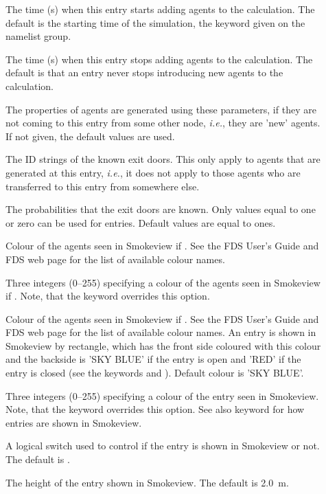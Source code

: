 \documentclass[12pt,a4paper,final,twoside]{stylevk}
\begin{document}
\begin{description}
%
\item[] The time (s) when this entry starts adding
  agents to the calculation.  The default is the starting time of the
  simulation, the  keyword given on the  
  namelist group.
%
\item[] The time (s) when this entry stops adding
  agents to the calculation.  The default is that an entry never stops
  introducing new agents to the calculation.
%
\item[] The properties of agents are generated using
  these parameters, if they are not coming to this entry from some
  other node, \emph{i.e.}, they are 'new' agents.  If not given, the
  default values are used.
%
\item[] The ID strings of the known exit
  doors.  This only apply to agents that are generated at this entry,
  \emph{i.e.}, it does not apply to those agents who are transferred to
  this entry from somewhere else.
%
\item[] The probabilities that the exit
  doors are known.  Only values equal to one or zero can be used for
  entries.  Default values are equal to ones.
%
\item[] Colour of the agents seen in Smokeview if
  .  See the FDS User's Guide and FDS web page
  for the list of available colour names. 
%
\item[] Three integers (0--255) specifying a colour
  of the agents seen in Smokeview if .  Note,
  that the  keyword overrides this option.
%
\item[] Colour of the agents seen in Smokeview if
  .  See the FDS User's Guide and FDS web page
  for the list of available colour names.  An entry is shown in
  Smokeview by rectangle, which has the front side coloured with this
  colour and the backside is 'SKY BLUE' if the entry is open and 'RED'
  if the entry is closed (see the keywords  and
  ).  Default colour is 'SKY BLUE'.
%
\item[] Three integers (0--255) specifying a colour of the
  entry seen in Smokeview.  Note, that the  keyword
  overrides this option.  See also  keyword for how
  entries are shown in Smokeview.
%
\item[] A logical switch used to control if the entry is
  shown in Smokeview or not.  The default is .
%
\item[] The height of the entry shown in Smokeview.  The
  default is 2.0~m.
%
\end{description}
\end{document}
